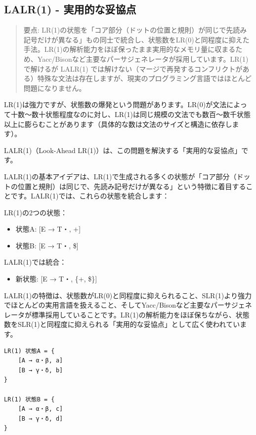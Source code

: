 \hypertarget{chapter5-lalr1---ux5b9fux7528ux7684ux306aux59a5ux5354ux70b9}{%
\subsection{LALR(1) -
実用的な妥協点}\label{chapter5-lalr1---ux5b9fux7528ux7684ux306aux59a5ux5354ux70b9}}

\begin{quote}
要点:
LR(1)の状態を「コア部分（ドットの位置と規則）が同じで先読み記号だけが異なる」もの同士で統合し、状態数をLR(0)と同程度に抑えた手法。LR(1)の解析能力をほぼ保ったまま実用的なメモリ量に収まるため、Yacc/Bisonなど主要なパーサジェネレータが採用しています。LR(1)で解けるが
LALR(1)
では解けない（マージで再発するコンフリクトがある）特殊な文法は存在しますが、現実のプログラミング言語ではほとんど問題になりません。
\end{quote}

LR(1)は強力ですが、状態数の爆発という問題があります。LR(0)が文法によって十数〜数十状態程度なのに対し、LR(1)は同じ規模の文法でも数百〜数千状態以上に膨らむことがあります（具体的な数は文法のサイズと構造に依存します）。

LALR(1)（Look-Ahead
LR(1)）は、この問題を解決する「実用的な妥協点」です。

LALR(1)の基本アイデアは、LR(1)で生成される多くの状態が「コア部分（ドットの位置と規則）は同じで、先読み記号だけが異なる」という特徴に着目することです。LALR(1)では、これらの状態を統合します：

LR(1)の2つの状態：

\begin{itemize}
\tightlist
\item
  状態A: {[}E → T・, +{]}
\item
  状態B: {[}E → T・, \${]}
\end{itemize}

LALR(1)では統合：

\begin{itemize}
\tightlist
\item
  新状態: {[}E → T・, \{+, \$\}{]}
\end{itemize}

LALR(1)の特徴は、状態数がLR(0)と同程度に抑えられること、SLR(1)より強力でほとんどの実用言語を扱えること、そしてYacc/Bisonなど主要なパーサジェネレータが標準採用していることです。LR(1)の解析能力をほぼ保ちながら、状態数をSLR(1)と同程度に抑えられる「実用的な妥協点」として広く使われています。

\begin{verbatim}
LR(1) 状態A = {
    [A → α・β, a]
    [B → γ・δ, b]
}

LR(1) 状態B = {
    [A → α・β, c]
    [B → γ・δ, d]
}
\end{verbatim}

